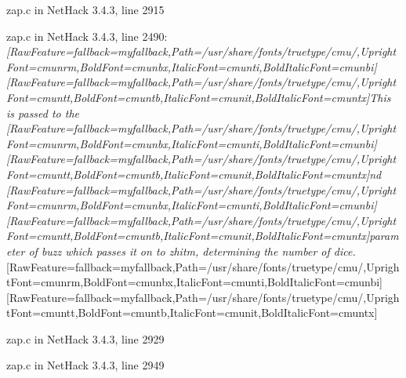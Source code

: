 \begin{myenumerate}
\item{} zap.c in NetHack 3.4.3, line 2915\footnotemark[224]
     

\item{} zap.c in NetHack 3.4.3, line 2490\footnotemark[225]: {\itshape \allowbreak{}\setmainfont{cmunti.ttf}[RawFeature={fallback=myfallback},Path=/usr/share/fonts/truetype/cmu/,UprightFont=cmunrm,BoldFont=cmunbx,ItalicFont=cmunti,BoldItalicFont=cmunbi]\setmonofont{cmunti.ttf}[RawFeature={fallback=myfallback},Path=/usr/share/fonts/truetype/cmu/,UprightFont=cmuntt,BoldFont=cmuntb,ItalicFont=cmunit,BoldItalicFont=cmuntx]\itshape This is passed to the {\ttfamily \allowbreak{}\setmainfont{cmunit.ttf}[RawFeature={fallback=myfallback},Path=/usr/share/fonts/truetype/cmu/,UprightFont=cmunrm,BoldFont=cmunbx,ItalicFont=cmunti,BoldItalicFont=cmunbi]\setmonofont{cmunit.ttf}[RawFeature={fallback=myfallback},Path=/usr/share/fonts/truetype/cmu/,UprightFont=cmuntt,BoldFont=cmuntb,ItalicFont=cmunit,BoldItalicFont=cmuntx]\ttfamily \itshape nd}{$\text{ }$}\allowbreak{}\setmainfont{cmunti.ttf}[RawFeature={fallback=myfallback},Path=/usr/share/fonts/truetype/cmu/,UprightFont=cmunrm,BoldFont=cmunbx,ItalicFont=cmunti,BoldItalicFont=cmunbi]\setmonofont{cmunti.ttf}[RawFeature={fallback=myfallback},Path=/usr/share/fonts/truetype/cmu/,UprightFont=cmuntt,BoldFont=cmuntb,ItalicFont=cmunit,BoldItalicFont=cmuntx]\itshape  parameter of buzz\footnotemark[226] which passes it on to zhitm\footnotemark[227], determining the number of dice.}\allowbreak{}\setmainfont{cmunrm.ttf}[RawFeature={fallback=myfallback},Path=/usr/share/fonts/truetype/cmu/,UprightFont=cmunrm,BoldFont=cmunbx,ItalicFont=cmunti,BoldItalicFont=cmunbi]\setmonofont{cmunrm.ttf}[RawFeature={fallback=myfallback},Path=/usr/share/fonts/truetype/cmu/,UprightFont=cmuntt,BoldFont=cmuntb,ItalicFont=cmunit,BoldItalicFont=cmuntx]
      

\item{} zap.c in NetHack 3.4.3, line 2929\footnotemark[228]
     

\item{} zap.c in NetHack 3.4.3, line 2949\footnotemark[229]
     


\end{myenumerate}
